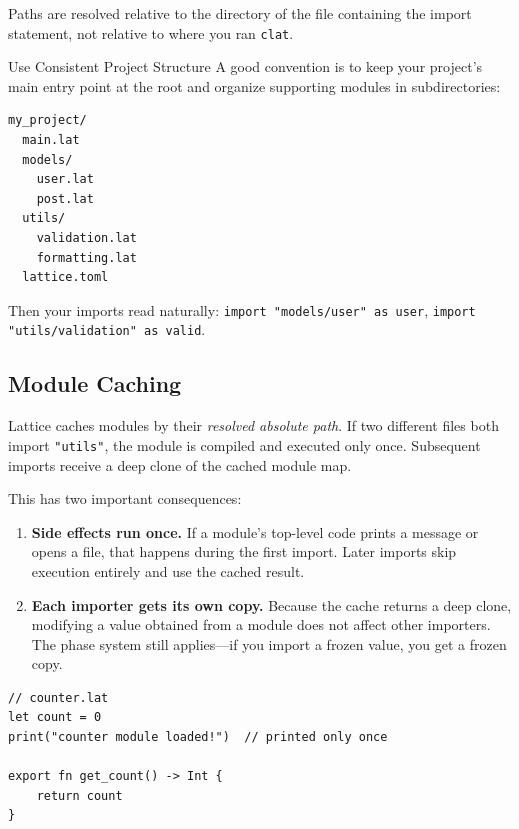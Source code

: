 Paths are resolved relative to the directory of the file containing the import statement, not relative to where you ran \texttt{clat}.

\begin{tipbox}{Use Consistent Project Structure}
A good convention is to keep your project's main entry point at the root and organize supporting modules in subdirectories:

\medskip
\begin{lstlisting}[language=bash, numbers=none]
my_project/
  main.lat
  models/
    user.lat
    post.lat
  utils/
    validation.lat
    formatting.lat
  lattice.toml
\end{lstlisting}

\medskip
Then your imports read naturally: \lstinline|import "models/user" as user|, \lstinline|import "utils/validation" as valid|.
\end{tipbox}

\subsection{Module Caching}\label{subsec:module-caching}

Lattice caches modules by their \emph{resolved absolute path}.
If two different files both import \lstinline|"utils"|, the module is compiled and executed only once.
Subsequent imports receive a deep clone of the cached module map.

This has two important consequences:

\begin{enumerate}
  \item \textbf{Side effects run once.} If a module's top-level code prints a message or opens a file, that happens during the first import.
  Later imports skip execution entirely and use the cached result.

  \item \textbf{Each importer gets its own copy.} Because the cache returns a deep clone, modifying a value obtained from a module does not affect other importers.
  The phase system still applies---if you import a frozen value, you get a frozen copy.
\end{enumerate}

\begin{lstlisting}[language=Lattice, caption={Module caching in action}]
// counter.lat
let count = 0
print("counter module loaded!")  // printed only once

export fn get_count() -> Int {
    return count
}
\end{lstlisting}

